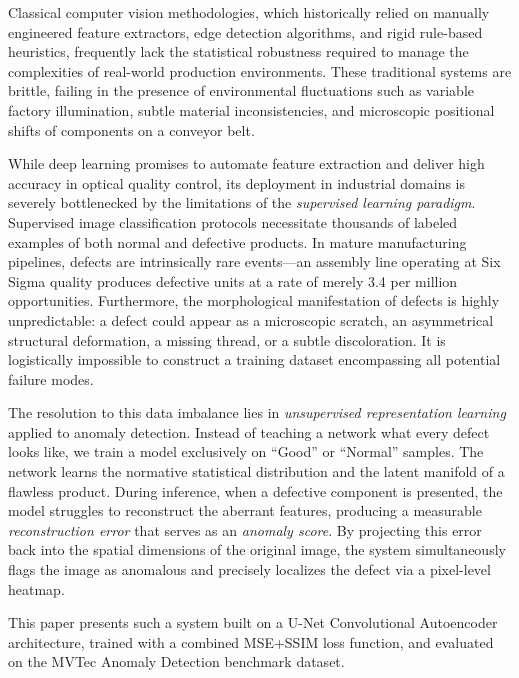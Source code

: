 \documentclass{article}
\begin{document}
Classical computer vision methodologies, which historically relied on manually engineered feature extractors, edge detection algorithms, and rigid rule-based heuristics, frequently lack the statistical robustness required to manage the complexities of real-world production environments. These traditional systems are brittle, failing in the presence of environmental fluctuations such as variable factory illumination, subtle material inconsistencies, and microscopic positional shifts of components on a conveyor belt.

While deep learning promises to automate feature extraction and deliver high accuracy in optical quality control, its deployment in industrial domains is severely bottlenecked by the limitations of the \emph{supervised learning paradigm}. Supervised image classification protocols necessitate thousands of labeled examples of both normal and defective products. In mature manufacturing pipelines, defects are intrinsically rare events---an assembly line operating at Six Sigma quality produces defective units at a rate of merely 3.4 per million opportunities. Furthermore, the morphological manifestation of defects is highly unpredictable: a defect could appear as a microscopic scratch, an asymmetrical structural deformation, a missing thread, or a subtle discoloration. It is logistically impossible to construct a training dataset encompassing all potential failure modes.

The resolution to this data imbalance lies in \emph{unsupervised representation learning} applied to anomaly detection. Instead of teaching a network what every defect looks like, we train a model exclusively on ``Good'' or ``Normal'' samples. The network learns the normative statistical distribution and the latent manifold of a flawless product. During inference, when a defective component is presented, the model struggles to reconstruct the aberrant features, producing a measurable \emph{reconstruction error} that serves as an \emph{anomaly score}. By projecting this error back into the spatial dimensions of the original image, the system simultaneously flags the image as anomalous and precisely localizes the defect via a pixel-level heatmap.

This paper presents such a system built on a U-Net Convolutional Autoencoder architecture, trained with a combined MSE+SSIM loss function, and evaluated on the MVTec Anomaly Detection benchmark dataset.

\end{document}
